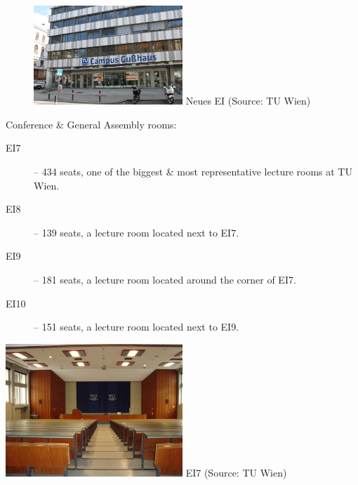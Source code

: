 \documentclass[10pt,a4paper]{article}
\begin{document}
\vspace{10pt}

\begin{figure}
\vspace{-22pt}
\begin{center}
\includegraphics[width=0.5\textwidth]{neues_ei_tuwien.jpg}
\footnotesize{Neues EI (Source: TU Wien)}
\end{center}
\vspace{-16pt}
\end{figure}

Conference \& General Assembly rooms:
\begin{description}
\item[\color{kdedarker} EI7] -- 434 seats, one of the biggest \& most representative lecture rooms at TU Wien.
\item[\color{kdedarker} EI8] -- 139 seats, a lecture room located next to EI7.
\item[\color{kdedarker} EI9] -- 181 seats, a lecture room located around the corner of EI7.
\item[\color{kdedarker} EI10]-- 151 seats, a lecture room located next to EI9.
\end{description}

\vspace{10pt}
\begin{center}
	\includegraphics[width=0.5\textwidth]{EI7_tuwien.jpg}
	\footnotesize{EI7 (Source: TU Wien)}
\end{center}
\vspace{10pt}
\end{document}

